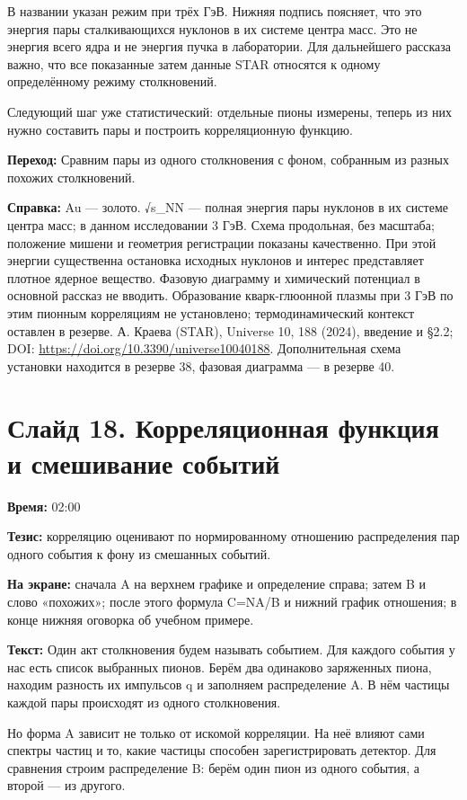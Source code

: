 \documentclass[11pt,a4paper]{article}
\begin{document}
В названии указан режим при трёх ГэВ. Нижняя подпись поясняет, что это энергия пары сталкивающихся нуклонов в их системе центра масс. Это не энергия всего ядра и не энергия пучка в лаборатории. Для дальнейшего рассказа важно, что все показанные затем данные STAR относятся к одному определённому режиму столкновений.

Следующий шаг уже статистический: отдельные пионы измерены, теперь из них нужно составить пары и построить корреляционную функцию.

\textbf{Переход:} Сравним пары из одного столкновения с фоном, собранным из разных похожих столкновений.

\textbf{Справка:} Au — золото. √s\_NN — полная энергия пары нуклонов в их системе центра масс; в данном исследовании 3 ГэВ. Схема продольная, без масштаба; положение мишени и геометрия регистрации показаны качественно. При этой энергии существенна остановка исходных нуклонов и интерес представляет плотное ядерное вещество. Фазовую диаграмму и химический потенциал в основной рассказ не вводить. Образование кварк-глюонной плазмы при 3 ГэВ по этим пионным корреляциям не установлено; термодинамический контекст оставлен в резерве. А. Краева (STAR), Universe 10, 188 (2024), введение и §2.2; DOI: \url{https://doi.org/10.3390/universe10040188}. Дополнительная схема установки находится в резерве 38, фазовая диаграмма — в резерве 40.

\clearpage
\section*{Слайд 18. Корреляционная функция и смешивание событий}
\textbf{Время:} 02:00

\textbf{Тезис:} корреляцию оценивают по нормированному отношению распределения пар одного события к фону из смешанных событий.

\textbf{На экране:} сначала A на верхнем графике и определение справа; затем B и слово «похожих»; после этого формула C=NA/B и нижний график отношения; в конце нижняя оговорка об учебном примере.

\textbf{Текст:} Один акт столкновения будем называть событием. Для каждого события у нас есть список выбранных пионов. Берём два одинаково заряженных пиона, находим разность их импульсов q и заполняем распределение A. В нём частицы каждой пары происходят из одного столкновения.

Но форма A зависит не только от искомой корреляции. На неё влияют сами спектры частиц и то, какие частицы способен зарегистрировать детектор. Для сравнения строим распределение B: берём один пион из одного события, а второй — из другого.
\end{document}
